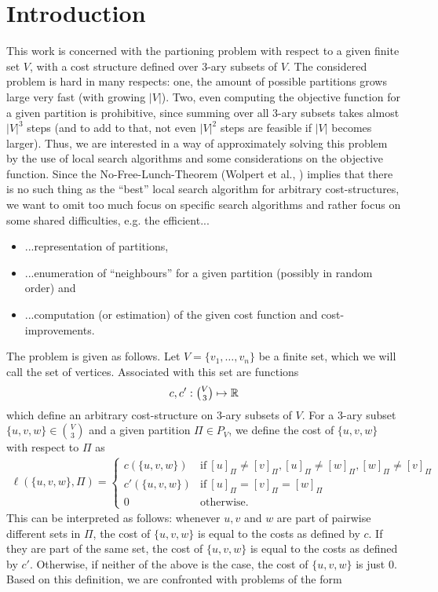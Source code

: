 \section{Introduction}
This work is concerned with the partioning problem with respect to a given finite set $V$, with a cost structure defined over 3-ary subsets of $V$. The considered problem is hard in many respects: one, the amount of possible partitions grows large very fast (with growing $|V|$). Two, even computing the objective function for a given partition is prohibitive, since summing over all $3$-ary subsets takes almost $|V|^3$ steps (and to add to that, not even $|V|^2$ steps are feasible if $|V|$ becomes larger). Thus, we are interested in a way of approximately solving this problem by the use of local search algorithms and some considerations on the objective function. Since the No-Free-Lunch-Theorem (Wolpert et al., \cite{wolpert1995no}) implies that there is no such thing as the ``best'' local search algorithm for arbitrary cost-structures, we want to omit too much focus on specific search algorithms and rather focus on some shared difficulties, e.g. the efficient... 
\begin{itemize}
    \item ...representation of partitions,
    \item ...enumeration of ``neighbours'' for a given partition (possibly in random order) and
    \item ...computation (or estimation) of the given cost function and cost-improvements.
\end{itemize}
The problem is given as follows. Let $V = \{ v_1,\dots,v_n \}$ be a finite set, which we will call the set of vertices. Associated with this set are functions $$ c,c': \tbinom{V}{3} \mapsto \mathbb{R} $$ which define an arbitrary cost-structure on $3$-ary subsets of $V$. For a $3$-ary subset $\{u,v,w\} \in \binom{V}{3}$ and a given partition $\Pi \in P_V$, we define the cost of $\{u,v,w\}$ with respect to $\Pi$ as  
\begin{align*}
    \ell(\{u,v,w\},\Pi) = \begin{cases}
        c(\{u,v,w\}) & \text{if}\ [u]_\Pi \neq [v]_\Pi, [u]_\Pi \neq [w]_\Pi, [w]_\Pi \neq [v]_\Pi \\
        c'(\{u,v,w\}) & \text{if}\ [u]_\Pi = [v]_\Pi = [w]_\Pi \\
        0 & \text{otherwise.}
    \end{cases}
\end{align*}
This can be interpreted as follows: whenever $u,v$ and $w$ are part of pairwise different sets in $\Pi$, the cost of $\{u,v,w\}$ is equal to the costs as defined by $c$. If they are part of the same set, the cost of $\{u,v,w\}$ is equal to the costs as defined by $c'$. Otherwise, if neither of the above is the case, the cost of $\{u,v,w\}$ is just $0$. Based on this definition, we are confronted with problems of the form
